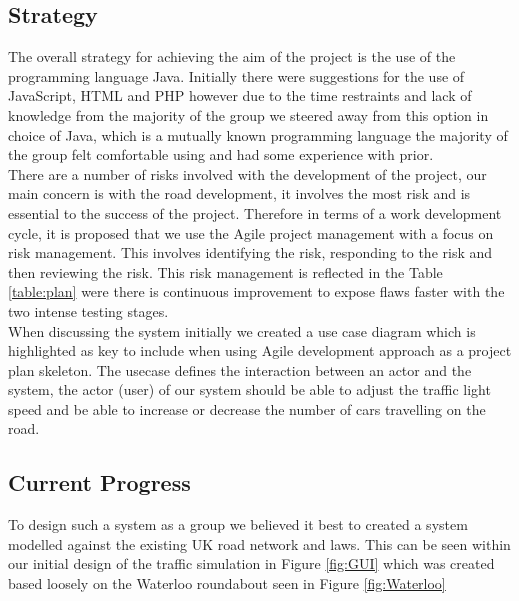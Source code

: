 \documentclass[a4paper,11pt]{article}
\begin{document}
\subsection{Strategy}%
The overall strategy for achieving the aim of the project is the use of the programming language Java. Initially there were suggestions for the use of JavaScript, HTML and PHP however due to the time restraints and lack of knowledge from the majority of the group we steered away from this option in choice of Java, which is a mutually known programming language the majority of the group felt comfortable using and had some experience with prior.\\There are a number of risks involved with the development of the project, our main concern is with the road development, it involves the most risk and is essential to the success of the project. Therefore in terms of a work development cycle, it is proposed that we use the Agile project management with a focus on risk management. This involves identifying the risk, responding to the risk and then reviewing the risk. This risk management is reflected in the Table \ref{table:plan} were there is continuous improvement to expose flaws faster with the two intense testing stages.\\When discussing the system initially we created a use case diagram which is highlighted as key to include when using Agile development approach as a project plan skeleton. The usecase defines the interaction between an actor and the system, the actor (user) of our system should be able to adjust the traffic light speed and be able to increase or decrease the number of cars travelling on the road.

\subsection{Current Progress}%
To design such a system as a group we believed it best to created a system modelled against the existing UK road network and laws. This can be seen within our initial design of the traffic simulation in Figure \ref{fig:GUI} which was created based loosely on the Waterloo roundabout seen in Figure \ref{fig:Waterloo}
\end{document}
